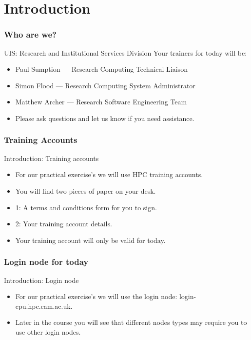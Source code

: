\part{Introduction}
\begin{frame}
\partpage
\end{frame}


\section{Who are we?}
\begin{frame}{UIS: Research and Institutional Services Division}
Your trainers for today will be:\\
\begin{itemize}
  \item Paul Sumption --- Research Computing Technical Liaison
    \item Simon Flood --- Research Computing System Administrator
  \item Matthew Archer --- Research Software Engineering Team
  \item\alert{Please ask questions and let us know if you need assistance.}
\end{itemize}
\end{frame}

\section{Training Accounts}
\begin{frame}{Introduction: Training accounts}
\begin{itemize}
\item{\alert{For our practical exercise's we will use HPC training accounts.}}
\pause
\item{You will find two pieces of paper on your desk.}
\pause
\item{1: A terms and conditions form for you to sign.}
\pause
\item{2: Your training account details.}
\pause
\item{Your training account will only be valid for today.}
\end{itemize}
\end{frame}

\section{Login node for today}
\begin{frame}{Introduction: Login node}
\begin{itemize}
\item{\alert{For our practical exercise's we will use the login node: login-cpu.hpc.cam.ac.uk.}}
\pause
\item{Later in the course you will see that different nodes types may require you to use other login nodes.}
\end{itemize}
\end{frame}

